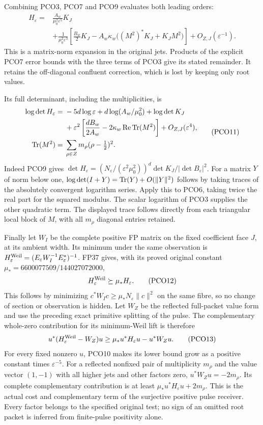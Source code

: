 Combining PCO3, PCO7 and PCO9 evaluates both leading orders:
\[
\begin{split}
 H_\varepsilon
 ={}&\frac{A_w}{\mu_0^2\varepsilon^5}K_J\\
 &+\frac1{\mu_0^2\varepsilon^3}
   \left[\frac{B_w}{2}K_J
     -A_w\kappa_w\big((M^2)^*K_J+K_JM^2\big)\right]
       +O_{Z,J}(\varepsilon^{-1}).
\end{split}
 \tag{PCO10}\label{pco:matrix-expansion}
\]
This is a matrix-norm expansion in the original jets. Products
of the explicit PCO7 error bounds with the three terms of PCO3
give its stated remainder. It retains the off-diagonal
confluent correction, which is lost by keeping only root values.

Its full determinant, including the multiplicities, is
\[
\begin{split}
 \log\det H_\varepsilon
 ={}&-5d\log\varepsilon+d\log(A_w/\mu_0^2)+\log\det K_J\\
 &+\varepsilon^2\left[
       \frac{dB_w}{2A_w}-2\kappa_w\operatorname{Re}\operatorname{Tr}(M^2)
                        \right]+O_{Z,J}(\varepsilon^4),\\
 \operatorname{Tr}(M^2)={}&\sum_{\rho\in Z}m_\rho(\rho-\tfrac12)^2.
\end{split}
 \tag{PCO11}\label{pco:determinant}
\]
Indeed PCO9 gives
$\det H_\varepsilon=(N_\varepsilon/(\varepsilon^2\mu_0^2))^d
\det K_J/|\det B_\varepsilon|^2$.
For a matrix $Y$ of norm below one,
$\log\det(I+Y)=\operatorname{Tr}(Y)+O(\|Y\|^2)$ follows by taking traces
of the absolutely convergent logarithm series. Apply this to
PCO6, taking twice the real part for the squared modulus.
The scalar logarithm of PCO3 supplies the other quadratic term.
The displayed trace follows directly from each triangular
local block of $M$, with all $m_\rho$ diagonal entries retained.

Finally let $W_I$ be the complete positive FP matrix on the
fixed coefficient face $J$, at its ambient width. Its minimum
under the same observation is
$H_\varepsilon^{\rm Weil}
 =(E_\varepsilon W_I^{-1}E_\varepsilon^*)^{-1}$.
FP37 gives, with its proved original constant
$\mu_*=6600077509/144027072000$,
\[
 H_\varepsilon^{\rm Weil}\succeq\mu_*H_\varepsilon.
 \tag{PCO12}\label{pco:weil-cost}
\]
This follows by minimizing
$c^*W_Ic\ge\mu_*N_\varepsilon\|c\|^2$ on the same fibre,
so no change of section or observation is hidden. Let $W_Z$
be the reflected full-packet value form and use the preceding
exact primitive splitting of the pulse. The complementary
whole-zero contribution for its minimum-Weil lift is therefore
\[
 u^*(H_\varepsilon^{\rm Weil}-W_Z)u
 \ge\mu_*u^*H_\varepsilon u-u^*W_Zu.
 \tag{PCO13}\label{pco:complement}
\]
For every fixed nonzero $u$, PCO10 makes its lower bound
grow as a positive constant times $\varepsilon^{-5}$.
For a reflected nonfixed pair of multiplicity $m_\rho$ and
the value vector $(1,-1)$ with all higher jets and other
factors zero, $u^*W_Zu=-2m_\rho$. Its complete complementary
contribution is at least
$\mu_*u^*H_\varepsilon u+2m_\rho$.
This is the actual cost and complementary term of the
surjective positive pulse receiver. Every factor belongs to
the specified original test; no sign of an omitted root
packet is inferred from finite-pulse positivity alone.

